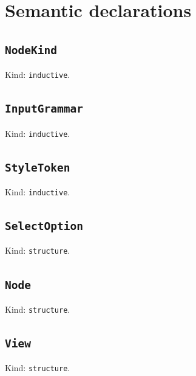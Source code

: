 \documentclass[11pt]{article}
\begin{document}
\section*{Semantic declarations}
\subsection*{\texttt{NodeKind}}
\noindent Kind: \texttt{inductive}.\par
\subsection*{\texttt{InputGrammar}}
\noindent Kind: \texttt{inductive}.\par
\subsection*{\texttt{StyleToken}}
\noindent Kind: \texttt{inductive}.\par
\subsection*{\texttt{SelectOption}}
\noindent Kind: \texttt{structure}.\par
\subsection*{\texttt{Node}}
\noindent Kind: \texttt{structure}.\par
\subsection*{\texttt{View}}
\noindent Kind: \texttt{structure}.\par
\end{document}
